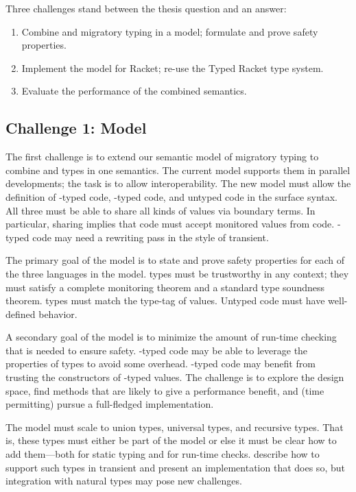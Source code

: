 Three challenges stand between the thesis question and an answer:

\begin{enumerate}
\item Combine \tdeep{} and \tshallow{} migratory typing in a model; formulate and prove safety properties.
\item Implement the model for Racket; re-use the Typed Racket type system.
\item Evaluate the performance of the combined semantics.
\end{enumerate}

\subsection{Challenge 1: Model}

The first challenge is to extend our semantic model of migratory typing to combine
 \tdeep{} and \tshallow{} types in one semantics.
The current model supports them in parallel developments; the task is to
 allow interoperability.
The new model must allow the definition of \tdeep{}-typed code,
 \tshallow{}-typed code, and untyped code in the surface syntax.
All three must be able to share all kinds of values via boundary terms.
In particular, sharing implies that \tshallow{} code must accept monitored
 values from \tdeep{} code.
\tDeep{}-typed code may need a rewriting pass in the style of transient.
 
The primary goal of the model is to state and prove safety properties for each
 of the three languages in the model.
\tDeep{} types must be trustworthy in any context; they must satisfy a complete
 monitoring theorem and a standard type soundness theorem.
\tShallow{} types must match the type-tag of values.
Untyped code must have well-defined behavior.

A secondary goal of the model is to minimize the amount of run-time checking
 that is needed to ensure safety.
\tShallow{}-typed code may be able to leverage the properties of \tdeep{} types
 to avoid some overhead.
\tDeep{}-typed code may benefit from trusting the constructors of \tshallow{}-typed
 values.
The challenge is to explore the design space, find methods that are likely to
 give a performance benefit, and (time permitting) pursue a full-fledged implementation.

The model must scale to union types, universal types, and recursive types.
That is, these types must either be part of the model or else it must be clear
 how to add them---both for static typing and
 for run-time checks.
\citet{gf-icfp-2018} describe how to support such types in transient and
 present an implementation that does so, but integration with natural types
 may pose new challenges.



